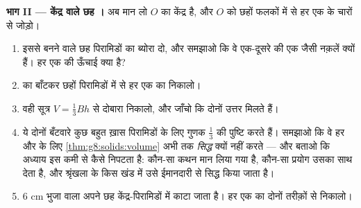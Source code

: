 \begin{problem}
\medskip
\noindent\textbf{भाग II --- केंद्र वाले छह ।}
अब मान लो $O$  का केंद्र है, और $O$ को छहों फलकों में से हर एक के
चारों  से जोड़ो।
\begin{enumerate}[resume]
  \item इससे बनने वाले छह पिरामिडों का ब्योरा दो, और समझाओ कि वे
        एक-दूसरे की एक जैसी नक़लें क्यों हैं। हर एक की ऊँचाई क्या
        है?
  \item {} का  बाँटकर छहों पिरामिडों में से हर एक का 
        निकालो।
  \item वही  सूत्र $V = \frac13 B h$ से दोबारा निकालो, और
        जाँचो कि दोनों उत्तर मिलते हैं।
  \item ये दोनों बँटवारे कुछ बहुत ख़ास पिरामिडों के लिए गुणक
        $\frac13$ की पुष्टि करते हैं। समझाओ कि वे हर  और
         के लिए \cref{thm:g8:solids:volume} अभी तक \emph{सिद्ध}
        क्यों नहीं करते --- और बताओ कि अध्याय इस कमी से कैसे
        निपटता है: कौन-सा कथन मान लिया गया है, कौन-सा प्रयोग उसका
        साथ देता है, और श्रृंखला के किस खंड में उसे ईमानदारी से
        सिद्ध किया जाता है।
  \item $6$ cm भुजा वाला  अपने छह केंद्र-पिरामिडों में काटा जाता
        है। हर एक का  दोनों तरीक़ों से निकालो।
\end{enumerate}


\end{problem}
